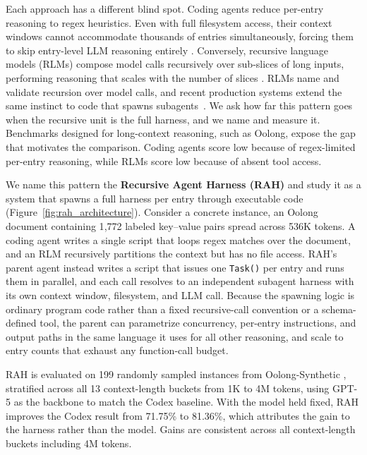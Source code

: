 \documentclass[sigconf,nonacm]{acmart}
\begin{document}
Each approach has a different blind spot. Coding agents reduce per-entry reasoning to regex heuristics.
Even with full filesystem access, their context windows cannot accommodate thousands of
entries simultaneously, forcing them to skip entry-level LLM reasoning entirely
\cite{sumers2023coala,mialon2023augmented}.
Conversely, recursive language models (RLMs) compose model calls recursively over sub-slices
of long inputs, performing reasoning that scales with the number of slices
\cite{zhang2024rlm}. RLMs name and validate recursion over model calls, and recent
production systems extend the same instinct to code that spawns subagents~\cite{anthropic2026workflows}.
We ask how far this pattern goes when the recursive unit is the full harness, and we name
and measure it. Benchmarks designed for long-context reasoning, such as Oolong,
expose the gap that motivates the comparison. Coding agents score low because of regex-limited
per-entry reasoning, while RLMs score low because of absent tool access.

We name this pattern the \textbf{Recursive Agent Harness (RAH)} and study it as a system
that spawns a full harness per entry through executable code
(Figure~\ref{fig:rah_architecture}). Consider a concrete instance, an Oolong document
containing 1{,}772 labeled key--value pairs spread across 536K tokens. A coding agent
writes a single script that loops regex matches over the document, and an RLM recursively
partitions the context but has no file access. RAH's parent agent instead writes a
script that issues one \texttt{Task()} per entry and runs them in parallel, and each call
resolves to an independent subagent harness with its own
context window, filesystem, and LLM call. Because the spawning logic is ordinary program code
rather than a fixed recursive-call convention or a schema-defined tool,
the parent can parametrize concurrency, per-entry instructions, and output paths in the same
language it uses for all other reasoning, and scale to entry counts that exhaust any
function-call budget.

RAH is evaluated on 199 randomly sampled instances from Oolong-Synthetic
\cite{cao2026oolong}, stratified across all 13 context-length buckets from 1K to 4M
tokens, using GPT-5 as the backbone to match the Codex baseline. With the model held fixed,
RAH improves the Codex result from 71.75\% to 81.36\%, which attributes the gain to the
harness rather than the model. Gains are consistent across all context-length buckets
including 4M tokens.
\end{document}
